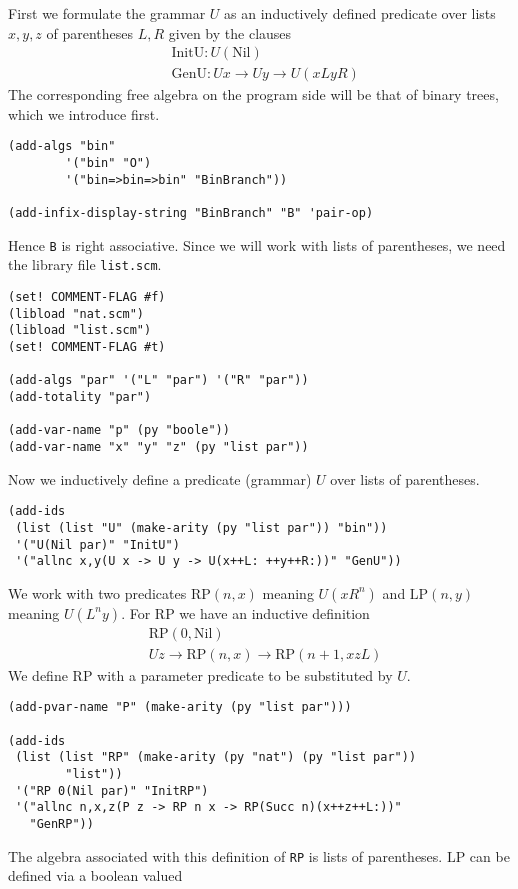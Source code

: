 \documentclass[12pt]{amsart}
\newcommand{\nil}{\mathrm{Nil}}
\begin{document}
First we formulate the grammar $U$ as an inductively defined predicate
over lists $x,y,z$ of parentheses $L,R$ given by the clauses
\begin{align*}
  & \mathrm{InitU} \colon U (\nil)
  \\
  & \mathrm{GenU} \colon U x \to U y \to U(xLyR)
\end{align*}
The corresponding free algebra on the program side will be that
of binary trees, which we introduce first.
\begin{verbatim}
(add-algs "bin"
        '("bin" "O")
        '("bin=>bin=>bin" "BinBranch"))

(add-infix-display-string "BinBranch" "B" 'pair-op)
\end{verbatim}
Hence \verb|B| is right associative.  Since we will work with lists
of parentheses, we need the library file \verb|list.scm|.
\begin{verbatim}
(set! COMMENT-FLAG #f)
(libload "nat.scm")
(libload "list.scm")
(set! COMMENT-FLAG #t)

(add-algs "par" '("L" "par") '("R" "par"))
(add-totality "par")

(add-var-name "p" (py "boole"))
(add-var-name "x" "y" "z" (py "list par"))
\end{verbatim}
Now we inductively define a predicate (grammar) $U$ over lists of
parentheses.
\begin{verbatim}
(add-ids
 (list (list "U" (make-arity (py "list par")) "bin"))
 '("U(Nil par)" "InitU")
 '("allnc x,y(U x -> U y -> U(x++L: ++y++R:))" "GenU"))
\end{verbatim}
We work with two predicates $\mathrm{RP}(n,x)$ meaning $U(x R^n)$ and
$\mathrm{LP}(n,y)$ meaning $U(L^n y)$.  For $\mathrm{RP}$ we have an
inductive definition
\begin{align*}
  & \mathrm{RP}(0,\nil)
  \\
  & U z \to \mathrm{RP}(n,x) \to \mathrm{RP}(n+1,xzL)
\end{align*}
We define $\mathrm{RP}$ with a parameter predicate to be substituted
by $U$.
\begin{verbatim}
(add-pvar-name "P" (make-arity (py "list par")))

(add-ids
 (list (list "RP" (make-arity (py "nat") (py "list par"))
        "list"))
 '("RP 0(Nil par)" "InitRP")
 '("allnc n,x,z(P z -> RP n x -> RP(Succ n)(x++z++L:))"
   "GenRP"))
\end{verbatim}
The algebra associated with this definition of \verb|RP| is lists of
parentheses.  $\mathrm{LP}$ can be defined via a boolean valued
\end{document}
